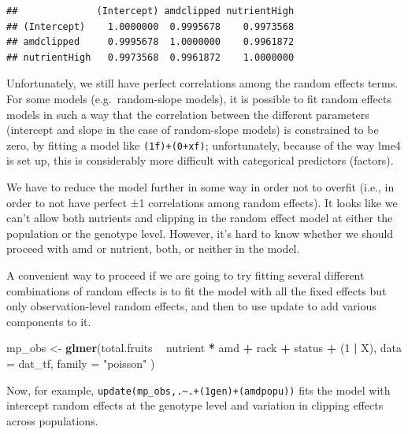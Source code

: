 \documentclass[
  12pt,
]{book}
\newenvironment{Shaded}{\begin{snugshade}}{\end{snugshade}}
\newcommand{\DataTypeTok}[1]{\textcolor[rgb]{0.13,0.29,0.53}{#1}}
\newcommand{\DecValTok}[1]{\textcolor[rgb]{0.00,0.00,0.81}{#1}}
\newcommand{\KeywordTok}[1]{\textcolor[rgb]{0.13,0.29,0.53}{\textbf{#1}}}
\newcommand{\NormalTok}[1]{#1}
\newcommand{\OperatorTok}[1]{\textcolor[rgb]{0.81,0.36,0.00}{\textbf{#1}}}
\newcommand{\StringTok}[1]{\textcolor[rgb]{0.31,0.60,0.02}{#1}}
\begin{document}
\begin{verbatim}
##              (Intercept) amdclipped nutrientHigh
## (Intercept)    1.0000000  0.9995678    0.9973568
## amdclipped     0.9995678  1.0000000    0.9961872
## nutrientHigh   0.9973568  0.9961872    1.0000000
\end{verbatim}

Unfortunately, we still have perfect correlations among the random effects terms. For some models (e.g.~random-slope models), it is possible to fit random effects models in such a way that the correlation between the different parameters (intercept and slope in the case of random-slope models) is constrained to be zero, by fitting a model like \texttt{(1\textbar{}f)+(0+x\textbar{}f)}; unfortunately, because of the way lme4 is set up, this is considerably more difficult with categorical predictors (factors).

We have to reduce the model further in some way in order not to overfit (i.e., in order to not have perfect ±1 correlations among random effects). It looks like we can't allow both nutrients and clipping in the random effect model at either the population or the genotype level. However, it's hard to know whether we should proceed with amd or nutrient, both, or neither in the model.

A convenient way to proceed if we are going to try fitting several different combinations of random effects is to fit the model with all the fixed effects but only observation-level random effects, and then to use update to add various components to it.

\begin{Shaded}
\begin{Highlighting}[]
\NormalTok{mp_obs <-}\StringTok{ }\KeywordTok{glmer}\NormalTok{(total.fruits }\OperatorTok{~}\StringTok{ }\NormalTok{nutrient }\OperatorTok{*}\StringTok{ }\NormalTok{amd }\OperatorTok{+}
\StringTok{  }\NormalTok{rack }\OperatorTok{+}\StringTok{ }\NormalTok{status }\OperatorTok{+}
\StringTok{  }\NormalTok{(}\DecValTok{1} \OperatorTok{|}\StringTok{ }\NormalTok{X),}
\DataTypeTok{data =}\NormalTok{ dat_tf, }\DataTypeTok{family =} \StringTok{"poisson"}
\NormalTok{)}
\end{Highlighting}
\end{Shaded}

Now, for example, \texttt{update(mp\_obs,.\textasciitilde{}.+(1\textbar{}gen)+(amd\textbar{}popu))} fits the model with intercept random effects at the genotype level and variation in clipping effects across populations.
\end{document}
